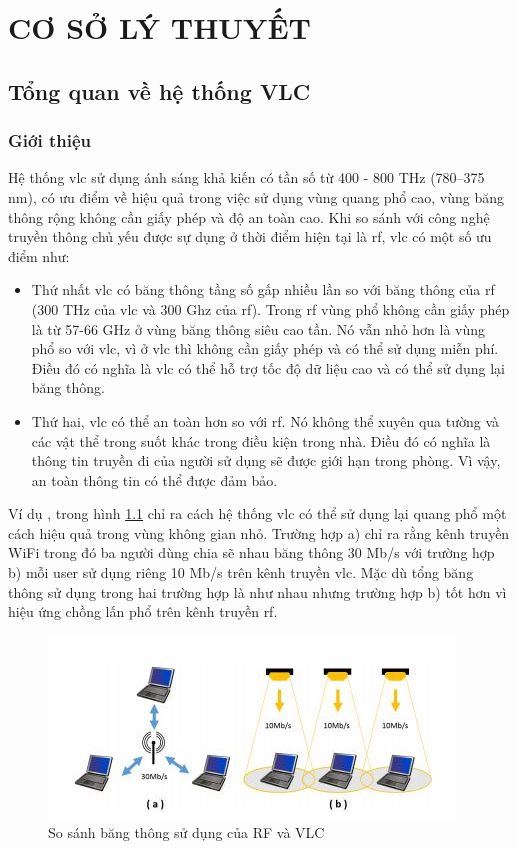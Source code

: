 \chapter{CƠ SỞ LÝ THUYẾT}\label{sec:chapter_2}
\section{Tổng quan về hệ thống VLC}

\subsection{Giới thiệu}
Hệ thống \ac{vlc} sử dụng ánh sáng khả kiến có tần số từ 400 - 800 THz (780–375 nm), có ưu điểm về hiệu quả trong việc sử dụng vùng quang phổ cao, vùng băng thông rộng không cần giấy phép và độ an toàn cao. Khi so sánh với công nghệ truyền thông chủ yếu được sự dụng ở thời điểm hiện tại là \ac{rf}, \ac{vlc} có một số ưu điểm như: 
\begin{itemize}
\item Thứ nhất \ac{vlc} có băng thông tầng số gấp nhiều lần so với băng thông của \ac{rf} (300 THz của \ac{vlc} và 300 Ghz của \ac{rf}). Trong \ac{rf} vùng phổ không cần giấy phép là từ 57-66 GHz ở vùng băng thông siêu cao tần. Nó vẫn nhỏ hơn là vùng phổ so với \ac{vlc}, vì ở \ac{vlc} thì không cần giấy phép và có thể sử dụng miễn phí. Điều đó có nghĩa là \ac{vlc} có thể hỗ trợ tốc độ dữ liệu cao và có thể sử dụng lại băng thông.   
\item Thứ hai, \ac{vlc} có thể an toàn hơn so với \ac{rf}. Nó không thể xuyên qua tường và các vật thể trong suốt khác trong điều kiện trong nhà. Điều đó có nghĩa là thông tin truyền đi của người sử dụng sẽ được giới hạn trong phòng. Vì vậy, an toàn thông tin có thể được đảm bảo. 
\end{itemize}

Ví dụ \cite{rf-vs-vlc}, trong hình \ref{fig:rf-vs-vlc} chỉ ra cách hệ thống \ac{vlc} có thể sử dụng lại quang phổ một cách hiệu quả trong vùng không gian nhỏ. Trường hợp a) chỉ ra rằng kênh truyền WiFi trong đó ba người dùng chia sẽ nhau băng thông 30 Mb/s với trường hợp b) mỗi user sử dụng riêng 10 Mb/s trên kênh truyền \ac{vlc}. Mặc dù tổng băng thông sử dụng trong hai trường hợp là như nhau nhưng trường hợp b) tốt hơn vì hiệu ứng chồng lấn phổ trên kênh truyền \ac{rf}.

\begin{figure} [ht]
\centering
\captionsetup{justification=centering}
\includegraphics [scale=1] {Image/rf_vs_vlc}
\caption{So sánh băng thông sử dụng của RF và VLC}
\label{fig:rf-vs-vlc}
\end{figure}

